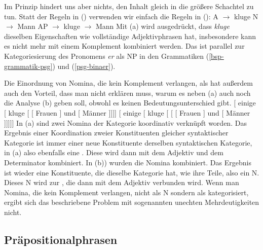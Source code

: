 Im Prinzip hindert uns aber nichts, den Inhalt gleich in die größere Schachtel zu tun. Statt der
Regeln in () verwenden wir einfach die Regeln in ():
\eal
\ex A $\to$ kluge
\ex N $\to$ Mann
\zl
\eal
\label{Lexikon-Projektion}
\ex AP $\to$ kluge
\ex \nbar $\to$ Mann
\zl
Mit (a) wird ausgedrückt, dass \emph{kluge} dieselben Eigenschaften wie vollständige
Adjektivphrasen hat, insbesondere kann es nicht mehr mit einem Komplement kombiniert werden. Das ist
parallel zur Kategoriesierung des Pronomens \emph{er} als NP in den Grammatiken
(\ref{bsp-grammatik-psg}) und (\ref{psg-binaer}).


Die Einordnung von Nomina, die kein Komplement verlangen, als \nbar hat außerdem auch den Vorteil,
dass man nicht erklären muss, warum es neben (a) auch noch die Analyse (b) geben soll, obwohl es
keinen Bedeutungsunterschied gibt.
\eal
\ex {}[ einige [\sub{\nbar} kluge [\sub{\nbar} [\sub{\nbar} Frauen ] und [\sub{\nbar} Männer
]]]]
\ex {}[ einige [\sub{\nbar} kluge [\sub{\nbar} [ [ Frauen ] und [ Männer
]]]]]
\zl
In (a) sind zwei Nomina der Kategorie \nbar koordinativ verknüpft worden. Das Ergebnis einer
Koordination zweier Konstituenten gleicher syntaktischer Kategorie ist immer einer neue Konstituente
derselben syntaktischen Kategorie, in (a) also ebenfalls eine \nbar. Diese wird dann mit dem
Adjektiv und dem Determinator kombiniert.
In (b)) wurden die Nomina kombiniert. Das Ergebnis ist wieder eine Konstituente, die dieselbe
Kategorie hat, wie ihre Teile, also ein N. Dieses N wird zur \nbar, die dann mit dem Adjektiv
verbunden wird. Wenn man Nomina, die kein Komplement verlangen, nicht als N sondern als \nbar
kategorisiert, ergibt sich das beschriebene Problem mit sogenannten unechten Mehrdeutigkeiten
nicht. 

\fi

\subsection{Präpositionalphrasen}

